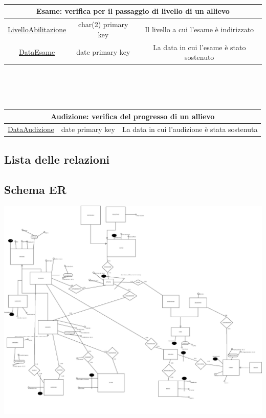 \documentclass[11pt]{article}
\begin{document}
		\\\\\\
		\begin{tabular}{|c|c|c|}
			\hline
			\multicolumn{3}{|c|}{\textbf{Esame}: verifica per il passaggio di livello di un allievo}\\
			\hline
			\underline{LivelloAbilitazione} & char(2) primary key & Il livello a cui l'esame è indirizzato\\
			\hline
			\underline{DataEsame} & date primary key & La data in cui l'esame è stato sostenuto\\
			\hline
		\end{tabular}
		\\\\\\
		\begin{tabular}{|c|c|c|}
			\hline
			\multicolumn{3}{|c|}{\textbf{Audizione}: verifica del progresso di un allievo}\\
			\hline
			\underline{DataAudizione} & date primary key & La data in cui l'audizione è stata sostenuta\\
			\hline
		\end{tabular}
	\subsection{Lista delle relazioni}
	\subsection{Schema ER}
		\includegraphics[scale=0.15]{ER.png}
\end{document}
